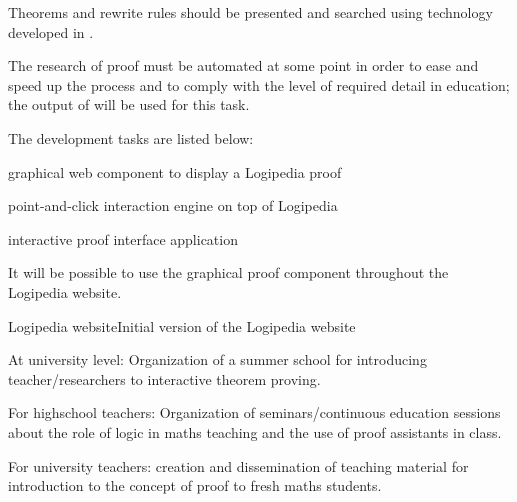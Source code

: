 \begin{workpackage}[id=dissemination,wphases=0-48,type=MGT,
  short=Dissemination,%
  title={Dissemination, communication and exploitation},
  lead=Inr]
\begin{tasklist}
\begin{task}[id=edukera,
      title=Web interface for doing proofs at school,
      lead=Edu,EduRM=12]
      Theorems and rewrite rules should be presented and searched using
      technology developed in .

      The research of proof must be automated at some point in order to ease
      and speed up the process and to comply with the level of required detail
      in education; the output of  will be used for this task.

      The development tasks are listed below:
      \begin{compactitem}
      \item graphical web component to display a Logipedia proof
      \item point-and-click interaction engine on top of Logipedia
      \item interactive proof interface application
      \end{compactitem}

      It will be possible to use the graphical proof component throughout
      the Logipedia website.
  \end{task}

\end{tasklist}

\begin{wpdelivs}

  
  \begin{wpdeliv}[due=1,miles=startup,id=requirements,dissem=PU,nature=DEC,lead=Inr]{Logipedia website}Initial version of the Logipedia website
  \end{wpdeliv}

  
  \begin{wpdeliv}[due=18,miles=???,id=summerschool,dissem=PU,nature=other,lead=Sac]{At university level: Organization of a summer school for introducing teacher/researchers to interactive theorem proving.}
  \end{wpdeliv}

  \begin{wpdeliv}[due=18,miles=???,id=continuoused,dissem=PU,nature=other,lead=Str]{
 For highschool teachers: Organization of seminars/continuous education sessions about the role of logic in maths teaching and the use of proof assistants in class.}
  \end{wpdeliv}

  \begin{wpdeliv}[due=18,miles=???,id=course-proof,dissem=PU,nature=other,lead=Str]{ For university teachers: creation and dissemination of teaching material for introduction to the concept of proof to fresh maths students.}
  \end{wpdeliv}


\end{wpdelivs}
\end{workpackage}
